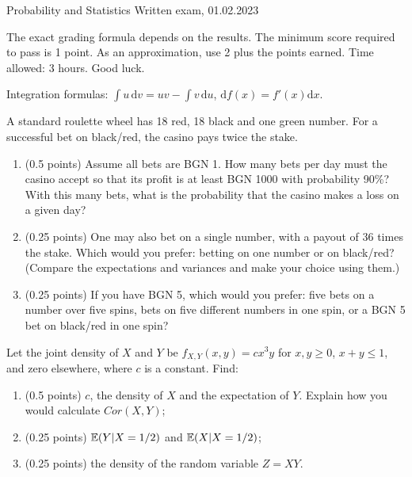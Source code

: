 \documentclass[a4paper]{report}
\begin{document}
\noindent Probability and Statistics \hfill Written exam, 01.02.2023

\hrulefill

\begin{it}
The exact grading formula depends on the results.
The minimum score required
to pass is 1 point. As an approximation, use 2 plus the points earned. Time allowed: 3 hours. Good luck.

Integration formulas:
$\int u \, \mathrm{d} v = uv - \int
v \, \mathrm{d} u$, $\mathrm{d} f(x) =
f'(x) \mathrm{d} x$.
\end{it}

\begin{problem}
A standard roulette wheel has 18 red, 18
black and one green number. For a successful
bet on
black/red, the casino pays
twice the stake.

\begin{enumerate}
    \item (0.5 points) Assume all bets are BGN 1. How many bets per day must the casino accept so that its profit is at least
    BGN 1000 with probability 90\%?
    With this many bets, what is the probability that the casino makes a loss
    on a given day?
    \item (0.25 points) One may also bet on a single number, with a payout of
    36 times the stake. Which would you prefer: betting on one number or on black/red? (Compare
    the expectations and variances and make your choice
    using them.)

    \item (0.25 points) If you have BGN 5, which would you prefer:
    five bets on a number over
    five spins, bets on five different numbers in one spin, or a BGN 5 bet on black/red in one spin?




\end{enumerate}

\end{problem}

\begin{problem}
Let the joint density of $X$ and $Y$ be $f_{X,Y}(x,y)=cx^3y$ for $x,y\geq0$, $x+y\leq1$, and zero elsewhere, where $c$ is
a constant. Find:

\begin{enumerate}

    \item (0.5 points) $c$, the density of $X$ and the expectation of $Y$.
    Explain how you would calculate
     $Cor(X, Y)$;
\item (0.25 points) $\mathbb {E}(Y|X=1/2)$ and
$\mathbb {E}(X|X=1/2)$;
\item (0.25 points) the density of the random variable $Z=XY$.

\end{enumerate}
\end{problem}
\end{document}
